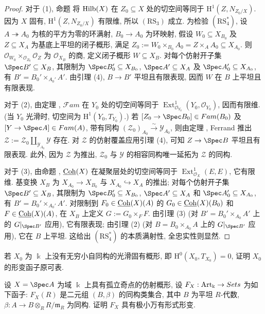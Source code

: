 \begin{proof}
对于 (1), 命题  将 $\operatorname{Hilb}(X)$ 在 $Z_0\subseteq X$ 处的切空间等同于 $\mathrm H^1(Z,N_{Z_0/X})$. 因为 $X$ 固有, $\mathrm H^1(Z,N_{Z_0/X})$ 有限维, 所以 $(\mathrm{RS}_3)$ 成立. 为检验 $(\mathrm{RS}_4^*)$, 设 $A\twoheadrightarrow A_0$ 为核的平方为零的环满射, $B_0\to A_0$ 为环映射, 假设 $W_0\subseteq X_{B_0}$ 及 $Z\subseteq X_A$ 为基底上平坦的闭子概形, 满足 $Z_0:=W_0\times_{B_0}A_0=Z\times_AA_0\subseteq X_{A_0}$. 则 $\mathcal O_{W_0}\times_{\mathcal O_{Z_0}}\mathcal O_Z$ 为 $\mathcal O_{X_B}$ 的商, 定义闭子概形 $W\subseteq X_B$. 对每个仿射开子集 $\Spec B'\subseteq X_B$, 其限制为 $\Spec B_0'\subseteq X_{B_0}$, $\Spec A'\subseteq X_A$ 及 $\Spec A_0'\subseteq X_{A_0}$, 有 $B'=B_0'\times_{A_0'}A'$. 由引理 (4), $B\to B'$ 平坦且有限表现, 因而 $W$ 在 $B$ 上平坦且有限表现.

对于 (2), 由定理 , $\mathcal{F}am$ 在 $Y_0$ 处的切空间等同于 $\operatorname{Ext}_{\mathcal O_{Y_0}}^1(Y_0,\mathcal O_{Y_0})$, 因而有限维. (当 $Y_0$ 光滑时, 切空间为 $\mathrm H^1(Y_0,T_{Y_0})$.) 若 $[\mathcal Z_0\to\Spec B_0]\in\mathcal{F}am(B_0)$ 及 $[\mathcal Y\to\Spec A]\in\mathcal{F}am(A)$, 带有同构 $(\mathcal Z_0)_{A_0}\xrightarrow{\sim}\mathcal Y_{A_0}$, 则由定理 , Ferrand 推出 $\mathcal Z:=\mathcal Z_0\amalg_{\mathcal Y_{A_0}}\mathcal Y$ 存在. 对 $\mathcal Z$ 的仿射覆盖应用引理 (4), 可知 $\mathcal Z\to\Spec B$ 平坦且有限表现. 此外, 因为 $\mathcal Z$ 为推出, $\mathcal Z_0$ 与 $\mathcal Y$ 的相容同构唯一延拓为 $\mathcal Z$ 的同构.

对于 (3), 由命题 , $\underline{\mathrm{Coh}}(X)$ 在凝聚层处的切空间等同于 $\operatorname{Ext}_{\mathcal O_X}^1(E,E)$, 它有限维. 基变换 $X_B$ 为 $X_{A_0}\to X_{B_0}$ 与 $X_{A_0}\hookrightarrow X_A$ 的推出; 对每个仿射开子集 $\Spec B'\subseteq X_B$, 其限制为 $\Spec B_0'\subseteq X_{B_0}$, $\Spec A'\subseteq X_A$ 和 $\Spec A_0'\subseteq X_{A_0}$, 有 $B'=B_0'\times_{A_0'}A'$. 对限制到 $F_0\in\underline{\mathrm{Coh}}(X)(A)$ 的 $G_0\in\underline{\mathrm{Coh}}(X)(B_0)$ 和 $F\in\underline{\mathrm{Coh}}(X)(A)$, 在 $X_B$ 上定义 $G:=G_0\times_FF$. 由引理 (3) (对 $B'=B_0'\times_{A_0}A'$ 上的 $G|_{\Spec B'}$ 应用), 它有限表现; 由引理 (2) (对 $B=B_0\times_{A_0}A$ 上的 $G|_{\Spec B'}$ 应用), 它在 $B$ 上平坦. 这给出 $(\mathrm{RS}_4^*)$ 的本质满射性, 全忠实性则显然.
\end{proof}
\begin{exercise}\label{src:C.4.15}
若 $X_0$ 为 $\Bbbk$ 上没有无穷小自同构的光滑固有概形, 即 $\mathrm H^0(X_0,T_{X_0})=0$, 证明 $X_0$ 的形变函子原可表.
\end{exercise}
\begin{exercise}\label{src:C.4.16}
设 $X=\Spec A$ 为域 $\Bbbk$ 上具有孤立奇点的仿射概形, 设 $F_X:\mathrm{Art}_{\Bbbk}\to Sets$ 为如下函子: $F_X(R)$ 是二元组 $(B,\beta)$ 的同构类集合, 其中 $B$ 为平坦 $R$-代数, $\beta:A\to B\otimes_RR/\mathfrak m_R$ 为同构. 证明 $F_X$ 具有极小万有形式形变.
\end{exercise}
